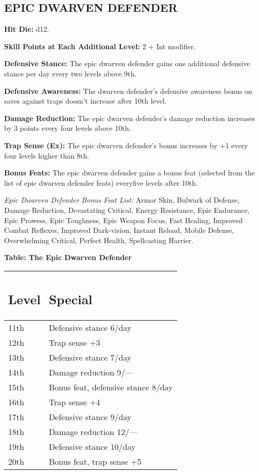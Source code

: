 \documentclass{article}
\begin{document}
\vspace{24pt}
\subsection*{{\LARGE{}EPIC DWARVEN DEFENDER }}

\textbf{Hit Die:} d12. 

\textbf{Skill Points at Each Additional Level:} 2 + Int modifier. 

\textbf{Defensive Stance:} The epic dwarven defender gains one additional defensive 
stance per day every two levels above 9th. 

\textbf{Defensive Awareness:} The dwarven defender's defensive awareness bonus 
on saves against traps doesn't increase after 10th level. 

\textbf{Damage Reduction:} The epic dwarven defender's damage reduction increases 
by 3 points every four levels above 10th. 

\textbf{Trap Sense (Ex):} The epic dwarven defender's bonus increases by +1 every 
four levels higher than 8th. 

\textbf{Bonus Feats:} The epic dwarven defender gains a bonus feat (selected from 
the list of epic dwarven defender feats) everyfive levels after 10th. 

\textit{Epic Dwarven Defender Bonus Feat List: }Armor Skin, Bulwark of Defense, 
Damage Reduction, Devastating Critical, Energy Resistance, Epic Endurance, Epic 
Prowess, Epic Toughness, Epic Weapon Focus, Fast Healing, Improved Combat Reflexes, 
Improved Dark-vision, Instant Reload, Mobile Defense, Overwhelming Critical, Perfect 
Health, Spellcasting Harrier. 

\textbf{Table: The Epic Dwarven Defender }

\begin{tabular}{|>{\raggedright}p{27pt}|>{\raggedright}p{142pt}|}
\hline
\subsection*{L\textbf{evel}} & \subsection*{S\textbf{pecial}}\tabularnewline
\hline
11th  & Defensive stance 6/day\tabularnewline
\hline
12th  & Trap sense +3\tabularnewline
\hline
13th  & Defensive stance 7/day\tabularnewline
\hline
14th  & Damage reduction 9/---\tabularnewline
\hline
15th  & Bonus feat, defensive stance 8/day\tabularnewline
\hline
16th  & Trap sense +4\tabularnewline
\hline
17th  & Defensive stance 9/day\tabularnewline
\hline
18th  & Damage reduction 12/---\tabularnewline
\hline
19th  & Defensive stance 10/day\tabularnewline
\hline
20th  & Bonus feat, trap sense +5\tabularnewline
\hline
\end{tabular}
\end{document}

